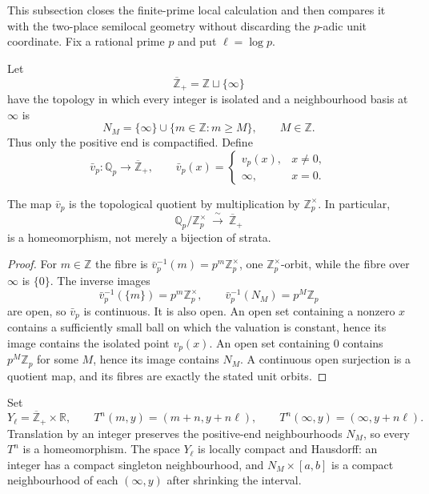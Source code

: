 This subsection closes the finite-prime local calculation and then compares it
with the two-place semilocal geometry without discarding the $p$-adic unit
coordinate.  Fix a rational prime $p$ and put $\ell=\log p$.

\begin{definition}
Let
\[
 \overline{\mathbb Z}_{+}=\mathbb Z\sqcup\{\infty\}
\]
have the topology in which every integer is isolated and a neighbourhood basis
at $\infty$ is
\[
 N_M=\{\infty\}\cup\{m\in\mathbb Z:m\geq M\},\qquad M\in\mathbb Z.
\]
Thus only the positive end is compactified.  Define
\[
 \bar v_p:\mathbb Q_p\longrightarrow\overline{\mathbb Z}_{+},\qquad
 \bar v_p(x)=
 \begin{cases}v_p(x),&x\ne0,\\ \infty,&x=0.
 \end{cases}
\]
\end{definition}

\begin{lemma}
\label{lem:primitive-valuation-quotient}
The map $\bar v_p$ is the topological quotient by multiplication by
$\mathbb Z_p^\times$.  In particular,
\[
 \mathbb Q_p/\mathbb Z_p^\times\ \xrightarrow{\ \sim\ }\
 \overline{\mathbb Z}_{+}
\]
is a homeomorphism, not merely a bijection of strata.
\end{lemma}

\begin{proof}
For $m\in\mathbb Z$ the fibre is
$\bar v_p^{-1}(m)=p^m\mathbb Z_p^\times$, one
$\mathbb Z_p^\times$-orbit, while the fibre over $\infty$ is $\{0\}$.
The inverse images
\[
 \bar v_p^{-1}(\{m\})=p^m\mathbb Z_p^\times,
 \qquad
 \bar v_p^{-1}(N_M)=p^M\mathbb Z_p
\]
are open, so $\bar v_p$ is continuous.  It is also open.  An open set
containing a nonzero $x$ contains a sufficiently small ball on which the
valuation is constant, hence its image contains the isolated point $v_p(x)$.
An open set containing $0$ contains $p^M\mathbb Z_p$ for some $M$, hence its
image contains $N_M$.  A continuous open surjection is a quotient map, and its
fibres are exactly the stated unit orbits.
\end{proof}

Set
\[
 Y_\ell=\overline{\mathbb Z}_{+}\times\mathbb R,
 \qquad
 T^n(m,y)=(m+n,y+n\ell),
 \qquad
 T^n(\infty,y)=(\infty,y+n\ell).
\]
Translation by an integer preserves the positive-end neighbourhoods $N_M$,
so every $T^n$ is a homeomorphism.  The space $Y_\ell$ is locally compact and
Hausdorff: an integer has a compact singleton neighbourhood, and
$N_M\times[a,b]$ is a compact neighbourhood of each $(\infty,y)$ after
shrinking the interval.

